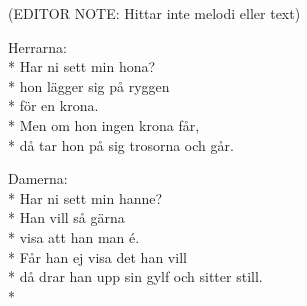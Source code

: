 \begin{SongText}
    \begin{SongInfo}
        (EDITOR NOTE: Hittar inte melodi eller text)
    \end{SongInfo}
    \begin{SongVerse}
        Herrarna:\\*%
        Har ni sett min hona?\\*%
        hon lägger sig på ryggen\\*%
        för en krona.\\*%
        Men om hon ingen krona får,\\*%
        då tar hon på sig trosorna och går.
    \end{SongVerse}
    \begin{SongVerse}
        Damerna:\\*%
        Har ni sett min hanne?\\*%
        Han vill så gärna\\*%
        visa att han man é.\\*%
        Får han ej visa det han vill\\*%
        då drar han upp sin gylf och sitter still. \\*%
    \end{SongVerse}
\end{SongText}
